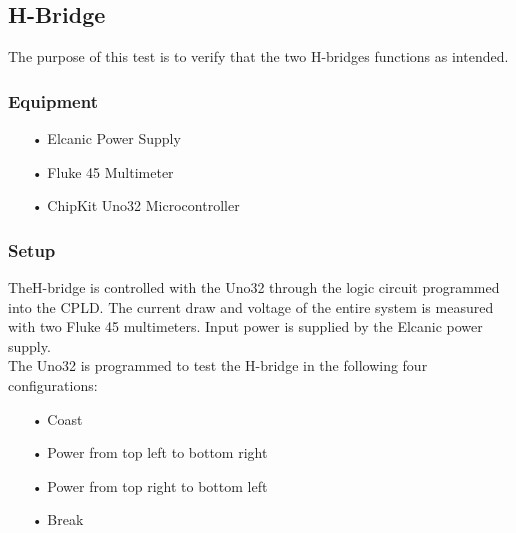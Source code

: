 \subsection{H-Bridge}
The purpose of this test is to verify that the two H-bridges functions as intended.

\subsubsection{Equipment}
\begin{enumerate}
	\item[•]Elcanic Power Supply
	\item[•]Fluke 45 Multimeter
	\item[•]ChipKit Uno32 Microcontroller
\end{enumerate}

\subsubsection{Setup}
TheH-bridge is controlled with the Uno32 through the logic circuit programmed into the CPLD. The current draw and voltage of the entire system is measured with two Fluke 45 multimeters. Input power is supplied by the Elcanic power supply.\\
The Uno32 is programmed to test the H-bridge in the following four configurations:
\begin{enumerate}
	\item[•]Coast
	\item[•]Power from top left to bottom right
	\item[•]Power from top right to bottom left
	\item[•]Break
\end{enumerate}

